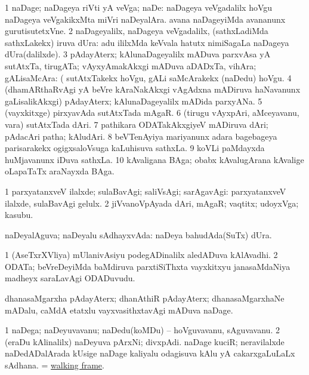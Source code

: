 \bentry
{} 
\gl{\nA}
\expl{}
\bmng
\bnum
\num{1} naDage; naDageya riVti yA veVga; naDe:  naDageya veVgadalilx hoVgu  naDageya veVgakikxMta miVri naDeyalAra.  avana naDageyiMda avananunx gurutisutetxVne. 
\num{2} naDageyalilx, naDageya veVgadalilx, (sathxLadiMda sathxLakekx) iruva dUra:  adu ililxMda keVvala hatutx nimiSagaLa naDageya dUra(dalilxde). 
\num{3} pAdayAterx; kAlunaDageyalilx mADuva parxvAsa yA sutAtxTa, tirugATa; vAyxyAmakAkxgi mADuva aDADxTa, vihAra; gALisaMcAra:  (  sutAtxTakekx hoVgu, gALi saMcArakekx (naDedu) hoVgu. 
\num{4} (dhamARthaRvAgi yA beVre kAraNakAkxgi vAgAdxna mADiruva haNavanunx gaLisalikAkxgi) pAdayAterx; kAlunaDageyalilx mADida parxyANa. 
\num{5} (vayxkitxge) pirxyavAda sutAtxTada mAgaR. 
\num{6} (tirugu vAyxpAri, aMceyavanu, \mo vara) sutAtxTada dAri. 
\num{7} pathikara ODATakAkxgiyeV mADiruva dAri; pAdacAri patha; kAludAri. 
\num{8} beVTenAyiya mariyanunx adara bagebageya parisarakekx ogigxsaloVsuga kaLuhisuva sathxLa. 
\num{9} koVLi paMdayxda huMjavanunx iDuva sathxLa. 
\num{10} kAvaligana BAga; obabx kAvalugArana kAvalige oLapaTaTx araNayxda BAga. 
\enum
\emng

\noindent 
\gl{\pagu}
\expl{}
\bmng
\bnum
\num{1}  parxyatanxveV ilalxde; sulaBavAgi; saliVsAgi; sarAgavAgi:  parxyatanxveV ilalxde, sulaBavAgi gelulx. 
\num{2}  jiVvanoVpAyada dAri, mAgaR; vaqtitx; udoyxVga; kasubu. 
\enum
\emng
\eentry

\bentry 
{} 
\gl{\gu}
\expl{}
\bmng
naDeyalAguva; naDeyalu sAdhayxvAda:  naDeya bahudAda(SuTx) dUra. 
\emng
\eentry

\bentry
{} 
\gl{\nA}
\expl{}
\bmng
\bnum
\num{1} (AseTxrXVliya) mUlanivAsiyu podegADinalilx aledADuva kAlAvadhi. 
\num{2} ODATa; beVreDeyiMda baMdiruva parxtiSiThxta vayxkitxyu janasaMdaNiya madheyx saraLavAgi ODADuvudu. 
\enum
\emng
\eentry

\bentry
{} 
\gl{\nA}
\expl{}
\bmng
dhanasaMgarxha pAdayAterx; dhanAthiR pAdayAterx; dhanasaMgarxhaNe mADalu, caMdA etatxlu vayxvasithxtavAgi mADuva naDage. 
\emng
\eentry

\bentry
{} 
\gl{\nA}
\bmng
\bnum
\num{1} naDega; naDeyuvavanu; naDedu(koMDu) -- hoVguvavanu, sAguvavanu. 
\num{2} (eraDu kAlinalilx) naDeyuva pArxNi; divxpAdi. 
\banum
{} naDage kuciR; neravilalxde naDedADalArada kUsige naDage kaliyalu odagisuva kAlu yA cakarxgaLuLaLx sAdhana. 
 = \hyperlink{walking frame}{walking frame}. 
\eanum
\numie
\enum
\emng
\eentry

